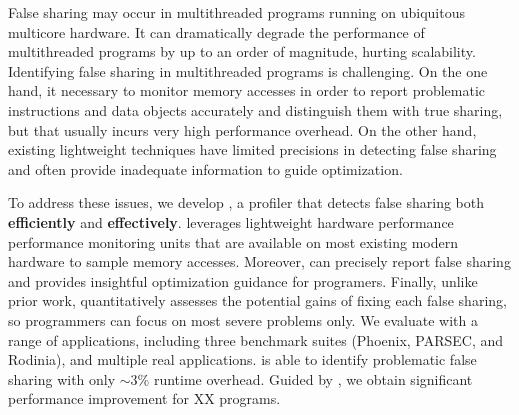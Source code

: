 
False sharing may occur in multithreaded programs running on ubiquitous multicore hardware. It can dramatically degrade the performance of multithreaded programs by up to an order of magnitude, hurting scalability. Identifying false sharing in multithreaded programs is challenging. On the one hand, it necessary to monitor memory accesses in order to report problematic instructions and data objects accurately and distinguish them with true sharing, but that usually incurs very high performance overhead. On the other hand, existing lightweight techniques have limited precisions in detecting false sharing and often provide inadequate information to guide optimization.

\sloppy
To address these issues, we develop \cheetah{}, a profiler that detects false sharing both {\bf efficiently} and {\bf effectively}. \cheetah{} leverages lightweight hardware performance performance monitoring units that are available on most existing modern hardware to sample memory accesses. Moreover, \cheetah{} can precisely report false sharing and provides insightful optimization guidance for programers. Finally,
unlike prior work, \cheetah{} quantitatively assesses the potential gains of fixing each false sharing, so programmers can focus on most severe problems only. %
We evaluate \cheetah{} with a range of applications, including three benchmark suites (Phoenix, PARSEC, and Rodinia), and multiple real applications. \Cheetah{} is able to identify problematic false sharing with only  $\sim$3\% runtime overhead. Guided by \Cheetah{}, we obtain significant performance improvement for XX programs.

